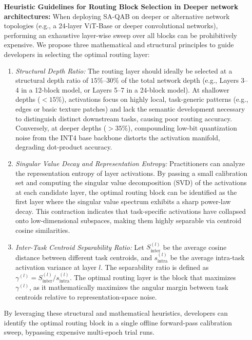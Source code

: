 \documentclass{article}
\theoremstyle{plain}
\theoremstyle{definition}
\theoremstyle{remark}
\begin{document}
\textbf{Heuristic Guidelines for Routing Block Selection in Deeper network architectures:} When deploying SA-QAB on deeper or alternative network topologies (e.g., a 24-layer ViT-Base or deeper convolutional networks), performing an exhaustive layer-wise sweep over all blocks can be prohibitively expensive. We propose three mathematical and structural principles to guide developers in selecting the optimal routing layer:
\begin{enumerate}
    \item \emph{Structural Depth Ratio:} The routing layer should ideally be selected at a structural depth ratio of $15\%\text{--}30\%$ of the total network depth (e.g., Layers 3--4 in a 12-block model, or Layers 5--7 in a 24-block model). At shallower depths ($< 15\%$), activations focus on highly local, task-generic patterns (e.g., edges or basic texture patches) and lack the semantic development necessary to distinguish distinct downstream tasks, causing poor routing accuracy. Conversely, at deeper depths ($> 35\%$), compounding low-bit quantization noise from the INT4 base backbone distorts the activation manifold, degrading dot-product accuracy.
    \item \emph{Singular Value Decay and Representation Entropy:} Practitioners can analyze the representation entropy of layer activations. By passing a small calibration set and computing the singular value decomposition (SVD) of the activations at each candidate layer, the optimal routing block can be identified as the first layer where the singular value spectrum exhibits a sharp power-law decay. This contraction indicates that task-specific activations have collapsed onto low-dimensional subspaces, making them highly separable via centroid cosine similarities.
    \item \emph{Inter-Task Centroid Separability Ratio:} Let $S_{\text{inter}}^{(l)}$ be the average cosine distance between different task centroids, and $s_{\text{intra}}^{(l)}$ be the average intra-task activation variance at layer $l$. The separability ratio is defined as $\gamma^{(l)} = S_{\text{inter}}^{(l)} / s_{\text{intra}}^{(l)}$. The optimal routing layer is the block that maximizes $\gamma^{(l)}$, as it mathematically maximizes the angular margin between task centroids relative to representation-space noise.
\end{enumerate}
By leveraging these structural and mathematical heuristics, developers can identify the optimal routing block in a single offline forward-pass calibration sweep, bypassing expensive multi-epoch trial runs.
\end{document}
